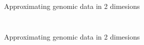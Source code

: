 \documentclass{beamer}
\begin{document}
\begin{frame}{Approximating genomic data in 2 dimesions }
\begin{columns}
\begin{column}{0.6\textwidth}
\begin{figure}
        \end{figure}   
    \end{column}
    \end{columns}
    \centering
    \vfill
    \tiny{\cite{lapedesGeometryShapeSpace2001,smithMappingAntigenicGenetic2004}}
\end{frame}
\begin{frame}{Approximating genomic data in 2 dimesions }


\end{frame}
\end{document}
